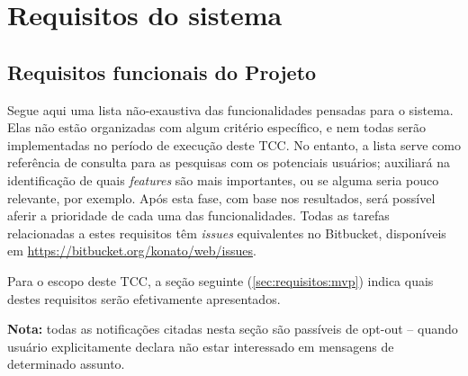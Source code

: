 \documentclass[12pt,a4paper,twoside,hyphens,english,brazil]{abntex2}
\begin{document}
\section{Requisitos do sistema} \label{sec:requisitos}

\subsection{Requisitos funcionais do Projeto}

Segue aqui uma lista não-exaustiva das funcionalidades pensadas para o sistema. Elas não estão organizadas com algum critério específico, e nem todas serão implementadas no período de execução deste TCC. No entanto, a lista serve como referência de consulta para as pesquisas com os potenciais usuários; auxiliará na identificação de quais \emph{features} são mais importantes, ou se alguma seria pouco relevante, por exemplo. Após esta fase, com base nos resultados, será possível aferir a prioridade de cada uma das funcionalidades. Todas as tarefas relacionadas a estes requisitos têm \emph{issues} equivalentes no Bitbucket, disponíveis em \url{https://bitbucket.org/konato/web/issues}.

Para o escopo deste TCC, a seção seguinte (\ref{sec:requisitos:mvp}) indica quais destes requisitos serão efetivamente apresentados.

\begin{framed}
	\noindent{}
	\textbf{Nota:} todas as notificações citadas nesta seção são passíveis de opt-out -- quando usuário explicitamente declara não estar interessado em mensagens de determinado assunto.
\end{framed}
\end{document}
